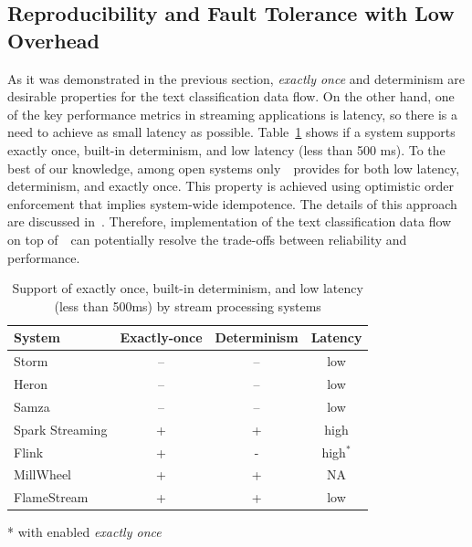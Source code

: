 \label {fs-solution}

\subsection{Reproducibility and Fault Tolerance with Low Overhead}

As it was demonstrated in the previous section, {\em exactly once} and determinism are desirable properties for the text classification data flow. On the other hand, one of the key performance metrics in streaming applications is latency, so there is a need to achieve as small latency as possible. Table~\ref{comparison} shows if a system supports exactly once, built-in determinism, and low latency (less than 500 ms). To the best of our knowledge, among open systems only~\FlameStream\ provides for both low latency, determinism, and exactly once. This property is achieved using optimistic order enforcement that implies system-wide idempotence. The details of this approach are discussed in~\cite{we2018adbis, we2018beyondmr, we2018seim}. Therefore, implementation of the text classification data flow on top of~\FlameStream\ can potentially resolve the trade-offs between reliability and performance.

\begin{table}[htbp]
\caption{Support of exactly once, built-in determinism, and low latency (less than 500ms) by stream processing systems}
\begin{threeparttable}
\begin{tabular}{lccc}
System & Exactly-once & Determinism & Latency    \\
\hline
Storm  &    --      &   --       &   low            \\
Heron  &    --      &   --       &   low            \\
Samza  &    --      &   --       &   low            \\
Spark Streaming    &    +       &   +        &   high           \\
Flink              &    +       &   -        &   high$^*$       \\
MillWheel          &    +       &   +        &   NA             \\
FlameStream        &    +       &   +        &   low            \\
\end{tabular}
* with enabled {\em exactly once}~\cite{we2018beyondmr}
\end{threeparttable}
\label{comparison}
\end{table}


